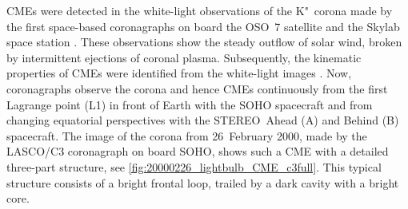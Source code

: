 CMEs were detected in the white-light observations of the K"~corona made by the first space-based coronagraphs on board the OSO~7 satellite \citep{Tousey1973} and the Skylab space station \citep{MacQueen1974}. These observations show the steady outflow of solar wind, broken by intermittent ejections of coronal plasma. Subsequently, the kinematic properties of CMEs were identified from the white-light images \citep{MacQueen1980}. Now, coronagraphs observe the corona and hence CMEs continuously from the first Lagrange point (L1) in front of Earth with the SOHO spacecraft and from changing equatorial perspectives with the STEREO~Ahead (A) and Behind (B) spacecraft. The image of the corona from 26~February 2000, made by the LASCO/C3 coronagraph on board SOHO, shows such a CME with a detailed three-part structure, see \autoref{fig:20000226_lightbulb_CME_c3full}. This typical structure consists of a bright frontal loop, trailed by a dark cavity with a bright core.
